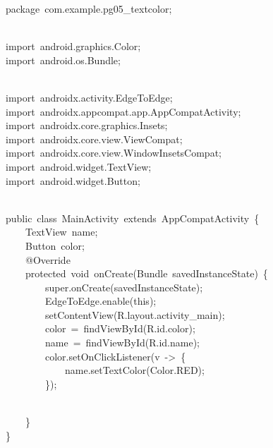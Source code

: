 {\ttfamily\small package\ com.example.pg05\_textcolor;} \\
\strut \\
{\ttfamily\small import\ android.graphics.Color;} \\
{\ttfamily\small import\ android.os.Bundle;} \\
\strut \\
{\ttfamily\small import\ androidx.activity.EdgeToEdge;} \\
{\ttfamily\small import\ androidx.appcompat.app.AppCompatActivity;} \\
{\ttfamily\small import\ androidx.core.graphics.Insets;} \\
{\ttfamily\small import\ androidx.core.view.ViewCompat;} \\
{\ttfamily\small import\ androidx.core.view.WindowInsetsCompat;} \\
{\ttfamily\small import\ android.widget.TextView;} \\
{\ttfamily\small import\ android.widget.Button;} \\
\strut \\
{\ttfamily\small public\ class\ MainActivity\ extends\ AppCompatActivity\ \{} \\
{\ttfamily\small \ \ \ \ TextView\ name;} \\
{\ttfamily\small \ \ \ \ Button\ color;} \\
{\ttfamily\small \ \ \ \ @Override} \\
{\ttfamily\small \ \ \ \ protected\ void\ onCreate(Bundle\ savedInstanceState)\ \{} \\
{\ttfamily\small \ \ \ \ \ \ \ \ super.onCreate(savedInstanceState);} \\
{\ttfamily\small \ \ \ \ \ \ \ \ EdgeToEdge.enable(this);} \\
{\ttfamily\small \ \ \ \ \ \ \ \ setContentView(R.layout.activity\_main);} \\
{\ttfamily\small \ \ \ \ \ \ \ \ color\ =\ findViewById(R.id.color);} \\
{\ttfamily\small \ \ \ \ \ \ \ \ name\ =\ findViewById(R.id.name);} \\
{\ttfamily\small \ \ \ \ \ \ \ \ color.setOnClickListener(v\ -\textgreater{}\ \{} \\
{\ttfamily\small \ \ \ \ \ \ \ \ \ \ \ \ name.setTextColor(Color.RED);} \\
{\ttfamily\small \ \ \ \ \ \ \ \ \});} \\
\strut \\
{\ttfamily\small \ \ \ \ \}} \\
{\ttfamily\small \}} \\
